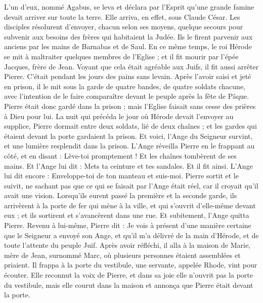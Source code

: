 \begin{multicols}{2}
{L'un d'eux, nommé Agabus, se leva et déclara par l'Esprit qu'une grande famine devait arriver sur toute la terre. Elle arriva, en effet, sous Claude César.
Les disciples résolurent d'envoyer, chacun selon ses moyens, quelque secours pour subvenir aux besoins des frères qui habitaient la Judée.
Ils le firent parvenir aux anciens par les mains de Barnabas et de Saul.
\VerseOne{}En ce même temps, le roi Hérode se mit à maltraiter quelques membres de l'Eglise ;
et il fit mourir par l'épée Jacques, frère de Jean.
Voyant que cela était agréable aux Juifs, il fit aussi arrêter Pierre. C'était pendant les jours des pains sans levain.
Après l'avoir saisi et jeté en prison, il le mit sous la garde de quatre bandes, de quatre soldats chacune, avec l'intention de le faire comparaître devant le peuple après la fête de Pâque.
Pierre était donc gardé dans la prison ; mais l'Eglise faisait sans cesse des prières à Dieu pour lui.
La nuit qui précéda le jour où Hérode devait l'envoyer au supplice, Pierre dormait entre deux soldats, lié de deux chaînes ; et les gardes qui étaient devant la porte gardaient la prison.
Et voici, l'Ange du Seigneur survint, et une lumière resplendit dans la prison. L'Ange réveilla Pierre en le frappant au côté, et en disant : Lève-toi promptement ! Et les chaînes tombèrent de ses mains.
Et l'Ange lui dit : Mets ta ceinture et tes sandales. Et il fit ainsi. L'Ange lui dit encore : Enveloppe-toi de ton manteau et suis-moi.
Pierre sortit et le suivit, ne sachant pas que ce qui se faisait par l'Ange était réel, car il croyait qu'il avait une vision.
Lorsqu'ils eurent passé la première et la seconde garde, ils arrivèrent à la porte de fer qui mène à la ville, et qui s'ouvrit d'elle-même devant eux ; et ils sortirent et s'avancèrent dans une rue. Et subitement, l'Ange quitta Pierre.
Revenu à lui-même, Pierre dit : Je vois à présent d'une manière certaine que le Seigneur a envoyé son Ange, et qu'il m'a délivré de la main d'Hérode, et de toute l'attente du peuple Juif.
Après avoir réfléchi, il alla à la maison de Marie, mère de Jean, surnommé Marc, où plusieurs personnes étaient assemblées et priaient.
Il frappa à la porte du vestibule, une servante, appelée Rhode, vint pour écouter.
Elle reconnut la voix de Pierre, et dans sa joie elle n'ouvrit pas la porte du vestibule, mais elle courut dans la maison et annonça que Pierre était devant la porte.
}
\end{multicols}
